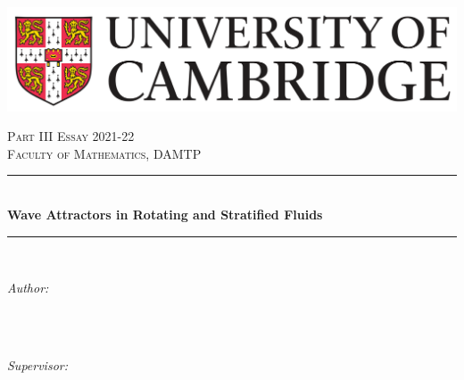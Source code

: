 \documentclass[a4paper]{article}
\numberwithin{equation}{section}
\begin{document}
\begin{titlepage}
 
\raggedleft
\includegraphics[scale=0.08]{Images/logo.png}\\

\vspace{5cm}
\begin{center}
\newcommand{\HRule}{\rule{\linewidth}{0.5mm}}
\textsc{\Large Part III Essay 2021-22}\\[2.0mm]
\textsc{\Large Faculty of Mathematics, DAMTP}\\[2.0mm]
\vspace{0.8cm}
	\HRule\\[0.4cm]
	{\huge\bfseries Wave Attractors in Rotating and Stratified Fluids}\\[0.4cm] 
	\HRule\\[1.5cm]
		\begin{minipage}{0.4\textwidth}
		\begin{flushleft}
			\large
			\textit{Author:}\\
			 \\
		\end{flushleft}
	\end{minipage}
	~
	\begin{minipage}{0.4\textwidth}
		\begin{flushright}
			\large
			\textit{Supervisor:}\\
			 \\
			\text{ } \\
		\end{flushright}
	\end{minipage}
\mbox{}
\vfill

\end{center}
\end{titlepage}
\end{document}
